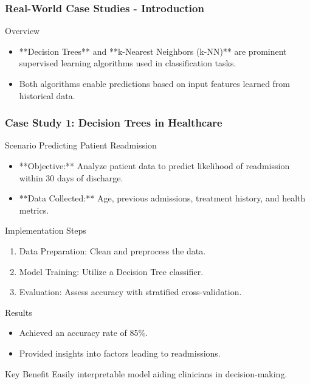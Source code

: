 \documentclass[aspectratio=169]{beamer}
\begin{document}
\begin{frame}[fragile]
  \frametitle{Real-World Case Studies - Introduction}
  \begin{block}{Overview}
    \begin{itemize}
      \item **Decision Trees** and **k-Nearest Neighbors (k-NN)** are prominent supervised learning algorithms used in classification tasks.
      \item Both algorithms enable predictions based on input features learned from historical data.
    \end{itemize}
  \end{block}
\end{frame}

\begin{frame}[fragile]
  \frametitle{Case Study 1: Decision Trees in Healthcare}
  \begin{block}{Scenario}
    Predicting Patient Readmission
  \end{block}
  \begin{itemize}
    \item **Objective:** Analyze patient data to predict likelihood of readmission within 30 days of discharge.
    \item **Data Collected:** Age, previous admissions, treatment history, and health metrics.
  \end{itemize}
  
  \begin{block}{Implementation Steps}
    \begin{enumerate}
      \item Data Preparation: Clean and preprocess the data.
      \item Model Training: Utilize a Decision Tree classifier.
      \item Evaluation: Assess accuracy with stratified cross-validation.
    \end{enumerate}
  \end{block}
  
  \begin{block}{Results}
    \begin{itemize}
      \item Achieved an accuracy rate of 85\%.
      \item Provided insights into factors leading to readmissions.
    \end{itemize}
  \end{block}
  
  \begin{block}{Key Benefit}
    Easily interpretable model aiding clinicians in decision-making.
  \end{block}
\end{frame}
\end{document}
